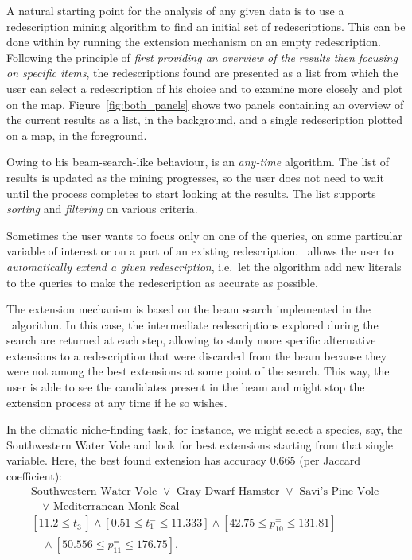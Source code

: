 
 A natural starting point for the
analysis of any given data is to use a redescription mining algorithm
to find an initial set of redescriptions.  This can be done within 
\Siren{} by running the extension mechanism on an empty redescription.
Following the principle of \emph{first providing an overview of the results
then focusing on specific items}, the redescriptions found are
presented as a list from which the user can select a redescription of
his choice and to examine more closely and plot on the map.
Figure~\ref{fig:both_panels} shows two panels containing an overview of
the current results as a list, in the background, and a single
redescription plotted on a map, in the foreground.

Owing to his beam-search-like behaviour, \ReReMi{} is an \emph{any-time} algorithm. 
The list of results is updated as the mining progresses, so the user does
not need to wait until the process completes to start looking at the
results. The list supports \emph{sorting} and \emph{filtering} on various criteria.

 Sometimes the user wants to focus only
on one of the queries, on some particular variable of interest or on a
part of an existing redescription.  \Siren\ allows the user to
\emph{automatically extend a given redescription}, i.e.\ let the algorithm
add new literals to the queries to make the redescription as accurate
as possible.

The extension mechanism is based on the beam search
implemented in the \ReReMi\ algorithm. In this
case, the intermediate redescriptions explored during the search are
returned at each step, allowing to study more specific alternative
extensions to a redescription that were discarded from the beam
because they were not among the best extensions at some point of the
search.  This way, the user is able to see the candidates present in
the beam and might stop the extension process at any time if he so
wishes.

In the climatic niche-finding task, for instance, we might select a
species, say, the Southwestern Water Vole and look for best extensions
starting from that single variable. Here, the best found extension has
accuracy $0.665$ (per Jaccard coefficient):
\begin{equation*}
\begin{array}{l}
\text{Southwestern Water Vole }\lor\text{ Gray Dwarf Hamster }\lor\text{ Savi's Pine Vole }\\[1mm]
\quad\lor\text{ Mediterranean Monk Seal}\\[3mm]
[11.2 \leq t_{3}^{+}] \land  [0.51 \leq t_{1}^{=} \leq 11.333]\land  [42.75 \leq p_{10}^{=} \leq 131.81] \\[1mm]
\quad\land [50.556 \leq p_{11}^{=} \leq 176.75],
\end{array}
\end{equation*}

